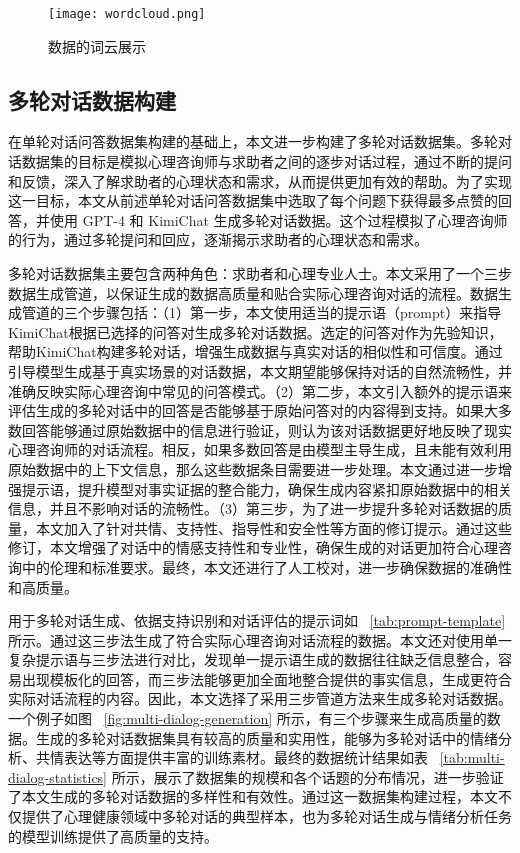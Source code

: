 \begin{figure}[ht]
  \centering
  \texttt{[image: wordcloud.png]}
  \caption{数据的词云展示}
  \label{wordcloud}
\end{figure}

\subsection{多轮对话数据构建}

在单轮对话问答数据集构建的基础上，本文进一步构建了多轮对话数据集。多轮对话数据集的目标是模拟心理咨询师与求助者之间的逐步对话过程，通过不断的提问和反馈，深入了解求助者的心理状态和需求，从而提供更加有效的帮助。为了实现这一目标，本文从前述单轮对话问答数据集中选取了每个问题下获得最多点赞的回答，并使用 GPT-4 和 KimiChat 生成多轮对话数据。这个过程模拟了心理咨询师的行为，通过多轮提问和回应，逐渐揭示求助者的心理状态和需求。

多轮对话数据集主要包含两种角色：求助者和心理专业人士。本文采用了一个三步数据生成管道，以保证生成的数据高质量和贴合实际心理咨询对话的流程。数据生成管道的三个步骤包括：（1）第一步，本文使用适当的提示语（prompt）来指导KimiChat根据已选择的问答对生成多轮对话数据。选定的问答对作为先验知识，帮助KimiChat构建多轮对话，增强生成数据与真实对话的相似性和可信度。通过引导模型生成基于真实场景的对话数据，本文期望能够保持对话的自然流畅性，并准确反映实际心理咨询中常见的问答模式。（2）第二步，本文引入额外的提示语来评估生成的多轮对话中的回答是否能够基于原始问答对的内容得到支持。如果大多数回答能够通过原始数据中的信息进行验证，则认为该对话数据更好地反映了现实心理咨询师的对话流程。相反，如果多数回答是由模型主导生成，且未能有效利用原始数据中的上下文信息，那么这些数据条目需要进一步处理。本文通过进一步增强提示语，提升模型对事实证据的整合能力，确保生成内容紧扣原始数据中的相关信息，并且不影响对话的流畅性。（3）第三步，为了进一步提升多轮对话数据的质量，本文加入了针对共情、支持性、指导性和安全性等方面的修订提示。通过这些修订，本文增强了对话中的情感支持性和专业性，确保生成的对话更加符合心理咨询中的伦理和标准要求。最终，本文还进行了人工校对，进一步确保数据的准确性和高质量。

用于多轮对话生成、依据支持识别和对话评估的提示词如 ~\ref{tab:prompt-template} 所示。通过这三步法生成了符合实际心理咨询对话流程的数据。本文还对使用单一复杂提示语与三步法进行对比，发现单一提示语生成的数据往往缺乏信息整合，容易出现模板化的回答，而三步法能够更加全面地整合提供的事实信息，生成更符合实际对话流程的内容。因此，本文选择了采用三步管道方法来生成多轮对话数据。一个例子如图 ~\ref{fig:multi-dialog-generation} 所示，有三个步骤来生成高质量的数据。生成的多轮对话数据集具有较高的质量和实用性，能够为多轮对话中的情绪分析、共情表达等方面提供丰富的训练素材。最终的数据统计结果如表 ~\ref{tab:multi-dialog-statistics} 所示，展示了数据集的规模和各个话题的分布情况，进一步验证了本文生成的多轮对话数据的多样性和有效性。通过这一数据集构建过程，本文不仅提供了心理健康领域中多轮对话的典型样本，也为多轮对话生成与情绪分析任务的模型训练提供了高质量的支持。

